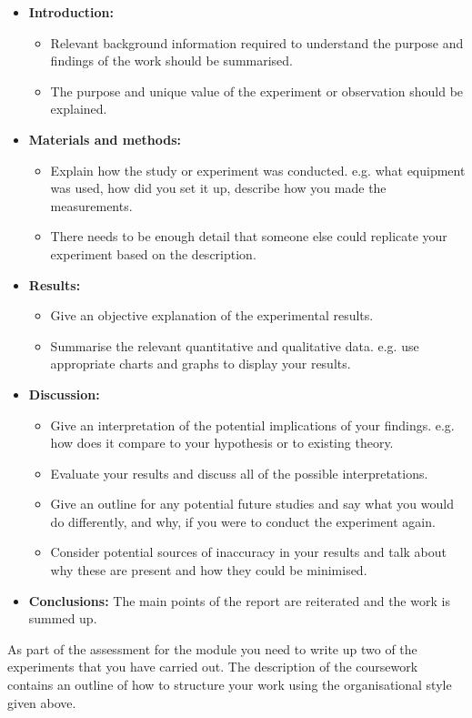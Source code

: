 \begin{itemize}
\setlength{\itemsep}{-5pt}
    \item \textbf{Introduction:}
    \begin{itemize}
\setlength{\itemsep}{-5pt}
    \item Relevant background information required to understand the purpose and findings of the work should be summarised.
    \item The purpose and unique value of the experiment or observation should be explained.
\end{itemize}
    \item \textbf{Materials and methods:}
    \begin{itemize}
\setlength{\itemsep}{-5pt}
    \item Explain how the study or experiment was conducted. e.g. what equipment was used, how did you set it up, describe how you made the measurements.
    \item There needs to be enough detail that someone else could replicate your experiment based on the description.
\end{itemize}
    \item \textbf{Results:}
    \begin{itemize}
\setlength{\itemsep}{-5pt}
    \item Give an objective explanation of the experimental results.
    \item Summarise the relevant quantitative and qualitative data. e.g. use appropriate charts and graphs to display your results.
\end{itemize}
    \item \textbf{Discussion:}
    \begin{itemize}
\setlength{\itemsep}{-5pt}
    \item Give an interpretation of the potential implications of your findings. e.g. how does it compare to your hypothesis or to existing theory. 
    \item Evaluate your results and discuss all of the possible interpretations.
    \item Give an outline for any potential future studies and say what you would do differently, and why, if you were to conduct the experiment again.
    \item Consider potential sources of inaccuracy in your results and talk about why these are present and how they could be minimised.
\end{itemize}
    \item \textbf{Conclusions:} The main points of the report are reiterated and the work is summed up.
\end{itemize}

As part of the assessment for the module you need to write up two of the experiments that you have carried out. The description of the coursework contains an outline of how to structure your work using the organisational style given above.